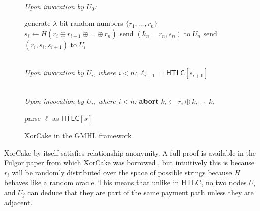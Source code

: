 \documentclass[USenglish,oneside,twocolumn]{article}
\begin{document}
\begin{figure}[t]
    \begin{framed}
        \begin{algorithmic}
            \\
            \emph{Upon invocation by $U_0$:}

            \State generate $\lambda$-bit random numbers $\{ r_1,\dots,r_n \}$
            \State $s_i \gets H(r_i\oplus r_{i+1}\oplus\dots\oplus r_n)$
            \State send $(k_n=r_n, s_n)$ to $U_n$
            \Else
            \State send $(r_i, s_i, s_{i+1})$ to $U_i$
            \EndIf
            \EndFor
            \EndFunction
        \end{algorithmic}
        \medskip
        \begin{algorithmic}
            \\
            \emph{Upon invocation by $U_i$, where $i<n$:}
            \State \Return $\ell_{i+1} = \mathsf{HTLC}[s_{i+1}]$
            \EndFunction
        \end{algorithmic}
        \medskip
        \begin{algorithmic}
            \\
            \emph{Upon invocation by $U_i$, where $i<n$:}
            \State \textbf{abort}
            \EndIf
            \State $k_i \gets r_i \oplus k_{i+1}$
            \State \Return $k_i$
            \EndFunction
        \end{algorithmic}
        \medskip
        \begin{algorithmic}
            \State parse $\ell$ as $\mathsf{HTLC}[s]$
            \State {}
            \Else
            \State {}
            \EndIf
            \EndFunction
        \end{algorithmic}
    \end{framed}
    \caption{XorCake in the GMHL framework}
    \label{fig:mh}
\end{figure}

XorCake by itself satisfies relationship anonymity. A full proof is available in the Fulgor paper from which XorCake was borrowed \cite{malavolta2019anonymous}, but intuitively this is because $r_i$ will be randomly distributed over the space of possible strings because $H$ behaves like a random oracle. This means that unlike in HTLC, no two nodes $U_i$ and $U_j$ can deduce that they are part of the same payment path unless they are adjacent.
\end{document}
